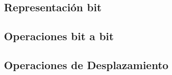\subsection{Representación bit}


\subsection{Operaciones bit a bit}


\subsection{Operaciones de Desplazamiento}
